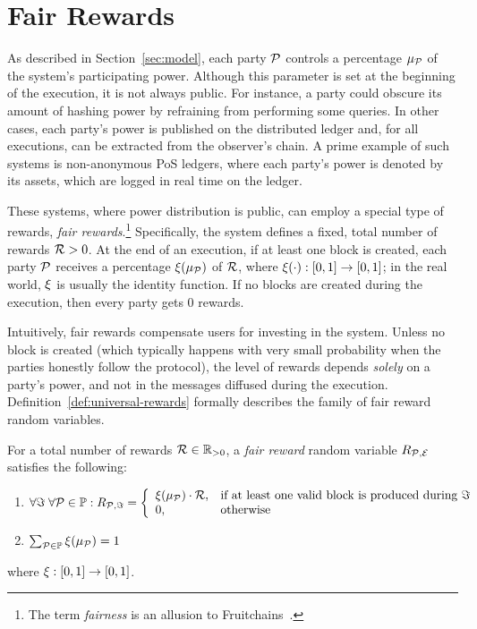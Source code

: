 \section{Fair Rewards}\label{sec:universal}

As described in Section~\ref{sec:model}, each party $\mathcal{P}$ controls a percentage
$\mu_{\mathcal{P}}$ of the system's participating power. Although
this parameter is set at the beginning of the execution, it is not always
public. For instance, a party could obscure its amount of hashing power by
refraining from performing some queries. In other cases, each
party's power is published on the distributed ledger and, for all executions,
can be extracted from the observer's chain. A prime example of such systems is
non-anonymous PoS ledgers, where each party's power is denoted by
its assets, which are logged in real time on the ledger.

These systems, where power distribution is public, can employ a special
type of rewards, \emph{fair rewards}.\footnote{The term
\emph{fairness} is an allusion to Fruitchains~\cite{PODC:PasShi17}.}
Specifically, the system
defines a fixed, total number of rewards $\mathcal{R} > 0$. At the end
of an execution, if at least one block is created, each party $\mathcal{P}$ receives
a percentage $\xi(\mu_{\mathcal{P}})$ of
$\mathcal{R}$, where $\xi(\cdot): [0, 1] \rightarrow [0, 1]$;
in the real world, $\xi$ is usually the identity
function. If no blocks are created during the execution, then every party gets
$0$ rewards.

Intuitively, fair rewards compensate users for investing in the
system. Unless no block is created (which typically happens with very small
probability when the parties honestly follow the protocol), the level of
rewards depends \emph{solely} on a party's power, and not in the messages
diffused during the execution. Definition~\ref{def:universal-rewards} formally
describes the family of fair reward random variables.

\begin{definition}\label{def:universal-rewards}
    For a total number of rewards $\mathcal{R} \in \mathbb{R}_{> 0}$, a
    \emph{fair reward} random variable $R_{\mathcal{P}, \mathcal{E}}$ satisfies
    the following:
    \begin{enumerate}
        \item $\forall \Im \; \forall \mathcal{P} \in \mathbb{P}: R_{\mathcal{P}, \Im} =
 \left\{\begin{array}{ll}
  \xi(\mu_{\mathcal{P}}) \cdot \mathcal{R},&\mbox{if at least one valid block is produced during }\Im\\
  0,&\mbox{otherwise}
\end{array}
\right.$
        \item $\sum_{\mathcal{P} \in \mathbb{P}} \xi(\mu_{\mathcal{P}}) = 1$
    \end{enumerate}
    where $\xi: [0, 1] \rightarrow [0, 1]$.
\end{definition}

